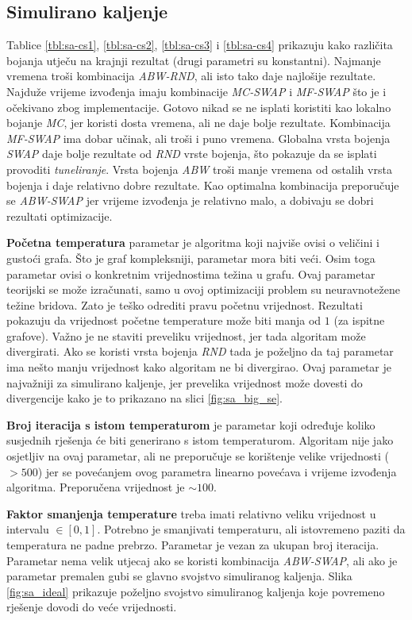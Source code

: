 \documentclass[times, utf8, diplomski, numeric]{fer}
\begin{document}
\subsection{Simulirano kaljenje}

Tablice \ref{tbl:sa-cs1}, \ref{tbl:sa-cs2}, \ref{tbl:sa-cs3} i \ref{tbl:sa-cs4} prikazuju kako različita bojanja utječu na krajnji rezultat (drugi parametri su konstantni). Najmanje vremena troši kombinacija \emph{ABW-RND}, ali isto tako daje najlošije rezultate. Najduže vrijeme izvođenja imaju kombinacije \emph{MC-SWAP} i \emph{MF-SWAP} što je i očekivano zbog implementacije. Gotovo nikad se ne isplati koristiti kao lokalno bojanje \emph{MC}, jer koristi dosta vremena, ali ne daje bolje rezultate. Kombinacija \emph{MF-SWAP} ima dobar učinak, ali troši i puno vremena. Globalna vrsta bojenja \emph{SWAP} daje bolje rezultate od \emph{RND} vrste bojenja, što pokazuje da se isplati provoditi \emph{tuneliranje}. Vrsta bojenja \emph{ABW} troši manje vremena od ostalih vrsta bojenja i daje relativno dobre rezultate. Kao optimalna kombinacija preporučuje se \emph{ABW-SWAP} jer vrijeme izvođenja je relativno malo, a dobivaju se dobri rezultati optimizacije.

\textbf{Početna temperatura} parametar je algoritma koji najviše ovisi o veličini i gustoći grafa. Što je graf kompleksniji, parametar mora biti veći. Osim toga parametar ovisi o konkretnim vrijednostima težina u grafu. Ovaj parametar teorijski se može izračunati, samo u ovoj optimizaciji problem su neuravnotežene težine bridova. Zato je teško odrediti pravu početnu vrijednost. Rezultati pokazuju da vrijednost početne temperature može biti manja od $1$ (za ispitne grafove). Važno je ne staviti preveliku vrijednost, jer tada algoritam može divergirati. Ako se koristi vrsta bojenja \emph{RND} tada je poželjno da taj parametar ima nešto manju vrijednost kako algoritam ne bi divergirao. Ovaj parametar je najvažniji za simulirano kaljenje, jer prevelika vrijednost može dovesti do divergencije kako je to prikazano na slici \ref{fig:sa_big_se}.

\textbf{Broj iteracija s istom temperaturom} je parametar koji određuje koliko susjednih rješenja će biti generirano s istom temperaturom. Algoritam nije jako osjetljiv na ovaj parametar, ali ne preporučuje se korištenje velike vrijednosti ($>500$) jer se povećanjem ovog parametra linearno povećava i vrijeme izvođenja algoritma. Preporučena vrijednost je $\sim 100$.

\textbf{Faktor smanjenja temperature} treba imati relativno veliku vrijednost u intervalu $\in[0,1]$. Potrebno je smanjivati temperaturu, ali istovremeno paziti da temperatura ne padne prebrzo. Parametar je vezan za ukupan broj iteracija. Parametar nema velik utjecaj ako se koristi kombinacija \emph{ABW-SWAP}, ali ako je parametar premalen gubi se glavno svojstvo simuliranog kaljenja. Slika \ref{fig:sa_ideal} prikazuje poželjno svojstvo simuliranog kaljenja koje povremeno rješenje dovodi do veće vrijednosti.
\end{document}
